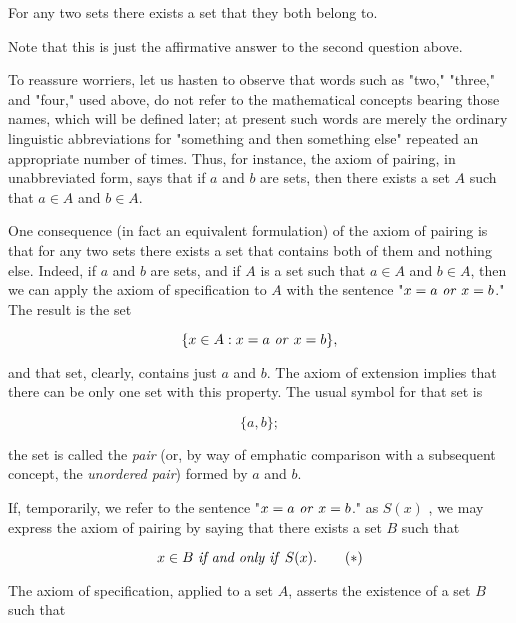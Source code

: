 \begin{named}  For any two sets there exists a set that they both belong to.
\end{named}


Note that this is just the affirmative answer to the second question above.

To reassure worriers, let us hasten to observe that words such as "two," "three," and "four," used above, do not refer to the mathematical concepts bearing those names, which will be defined later; at present such words are merely the ordinary linguistic abbreviations for "something and then something else" repeated an appropriate number of times. Thus, for instance, the axiom of pairing, in unabbreviated form, says that if $a$ and $b$ are sets, then there exists a set $A$ such that $a \in A$ and $b \in A$.

One consequence (in fact an equivalent formulation) of the axiom of pairing is that for any two sets there exists a set that contains both of them and nothing else. Indeed, if $a$ and $b$ are sets, and if $A$ is a set such that $a \in A$ and $b \in A$, then we can apply the axiom of specification to $A$ with the sentence "$x = a \text{ \textit{or} } x = b$." The result is the set 

\begin{equation*}
\{ x \in A: x = a \text{ \textit{or} } x = b \},
\end{equation*}

and that set, clearly, contains just $a$ and $b$. The axiom of extension implies that there can be only one set with this property. The usual symbol for that set is

\begin{equation*}
\{ a, b \};
\end{equation*}

the set is called the \textit{pair} (or, by way of emphatic comparison with a subsequent concept, the \textit{unordered pair}) formed by $a$ and $b$. 

If, temporarily, we refer to the sentence "$x = a \text{ \textit{or} } x = b$." as $S(x)$ , we may express the axiom of pairing by saying that there exists a set $B$ such that 

\begin{equation}
\label{eq3.1}
x \in B \text{ \textit{if and only if} } S(x). \tag{$\ast$}
\end{equation}

The axiom of specification, applied to a set $A$, asserts the existence of a set $B$ such that 

